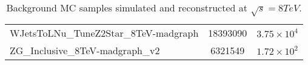 \begin{table}[h!]
\begin{center}
{\begin{tabular}{lcc}
WJetsToLNu\_TuneZ2Star\_8TeV-madgraph & 18393090 & $3.75\times10^{4}$\\	
ZG\_Inclusive\_8TeV-madgraph\_v2 & 6321549 & $1.72\times10^{2}$\\	
\hline
\end{tabular}
}
\caption{Background MC samples simulated and reconstructed at $\sqrt{s}=8\unit{TeV}$. 
}
   \label{Table:BkgSamples}
\end{center}
\end{table}
